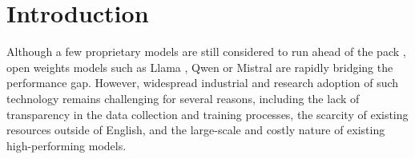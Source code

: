 \section{Introduction}


Although a few proprietary models  are still considered to run ahead of the pack , open weights models such as Llama , Qwen  or Mistral  are rapidly bridging the performance gap. However, widespread industrial and research adoption of such technology remains challenging for several reasons, including the lack of transparency in the data collection and training processes, the scarcity of existing resources outside of English, and the large-scale and costly nature of existing high-performing models.


